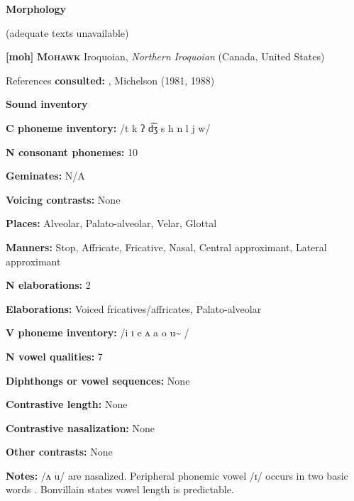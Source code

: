 \textbf{Morphology}



(adequate texts unavailable)



\textbf{[moh]}   \textbf{\textsc{Mohawk}}  Iroquoian, \textit{Northern} \textit{Iroquoian} (Canada, United States)



References \textbf{consulted:} \citet{Bonvillain1973}, Michelson (1981, 1988)



\textbf{Sound inventory}



\textbf{C phoneme inventory:} /t k ʔ d͡ʒ s h n l j w/



\textbf{N consonant phonemes:} 10



\textbf{Geminates:} N/A



\textbf{Voicing contrasts:} None



\textbf{Places:} Alveolar, Palato-alveolar, Velar, Glottal



\textbf{Manners:} Stop, Affricate, Fricative, Nasal, Central approximant, Lateral approximant



\textbf{N elaborations:} 2



\textbf{Elaborations:} Voiced fricatives/affricates, Palato-alveolar



\textbf{V phoneme inventory:} /i ɪ e ʌ a o u\~{} /



\textbf{N vowel qualities:} 7



\textbf{Diphthongs or vowel sequences:} None



\textbf{Contrastive length:} None



\textbf{Contrastive nasalization:} None



\textbf{Other contrasts:} None



\textbf{Notes:} /ʌ u/ are nasalized. Peripheral phonemic vowel /ɪ/ occurs in two basic words \citep[43]{Bonvillain1973}. Bonvillain states vowel length is predictable.



